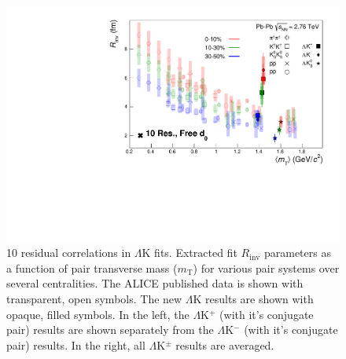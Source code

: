 \documentclass[../AnalysisNoteJBuxton.tex]{subfiles}
\begin{document}
\begin{figure}[h]
  \centering
  \includegraphics[width=\textwidth]{7_ResultsAndDiscussion/Figures/mTscaling_MinvCalc_OutlinedPoints_OthersTransparent_10Res_FreeD0.pdf}
  \caption[$m_{\mathrm{T}}$ Scaling of Radii: 10 Residuals in Fit]{10 residual correlations in $\Lambda$K fits.  Extracted fit $R_{\mathrm{inv}}$ parameters as a function of pair transverse mass ($m_{\mathrm{T}}$) for various pair systems over several centralities. The ALICE published data \cite{Adam:2015vja} is shown with transparent, open symbols.  The new $\Lambda$K results are shown with opaque, filled symbols.  In the left, the $\Lambda$K$^{+}$ (with it's conjugate pair) results are shown separately from the $\Lambda$K$^{-}$ (with it's conjugate pair) results.  In the right, all $\Lambda$K$^{\pm}$ results are averaged.}
  \label{fig:mTScalingOfRadii}
\end{figure}

\clearpage
\end{document}
